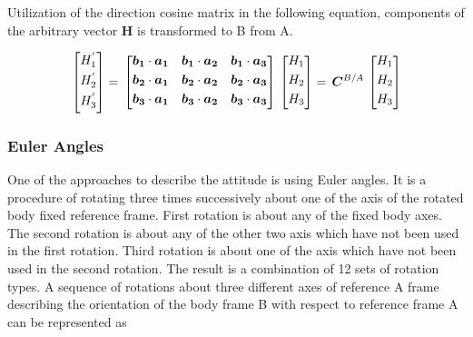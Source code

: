Utilization of the direction cosine matrix in the following equation, components of 
the arbitrary vector $\bm{H}$ is transformed to B from A.

\begin{equation}{\label{transformVectorH}}
\begin{bmatrix}
H_1^{'}\\[0.3em]
H_2^{'}\\[0.3em]
H_3^{'}\\[0.3em]
\end{bmatrix}
=\,
\begin{bmatrix}
 \bm{b_1} \cdot \bm{a_1}  &  \bm{b_1} \cdot \bm{a_2}  &  \bm{b_1} \cdot \bm{a_3} \\[0.3em]
 \bm{b_2} \cdot \bm{a_1}  & \bm{b_2} \cdot \bm{a_2}  & \bm{b_2} \cdot \bm{a_3} \\[0.3em]
 \bm{b_3} \cdot \bm{a_1}  & \bm{b_3} \cdot \bm{a_2}  &  \bm{b_3} \cdot \bm{a_3} \\[0.3em]
\end{bmatrix}
\,
\begin{bmatrix}
 H_1\\[0.3em]
 H_2\\[0.3em]
 H_3\\[0.3em]
\end{bmatrix}
=\,
\bm{C}^{B/A}
\,
\begin{bmatrix}
H_1\\[0.3em]
H_2\\[0.3em]
H_3\\[0.3em]
\end{bmatrix}
\end{equation} 

\subsubsection{Euler Angles}

One of the approaches to describe the attitude is using Euler angles. It is a procedure 
of rotating three times successively about one of the axis of the rotated body fixed 
reference frame. First rotation is about any of the fixed body axes. The second rotation 
is about any of the other two axis which have not been used in the first rotation. Third 
rotation is about one of the axis which have not been used in the second rotation. 
The result is a combination of 12 sets of rotation types. 
A sequence of rotations about three different axes of reference A frame describing 
the orientation of the body frame B with respect to reference frame A can be represented as

